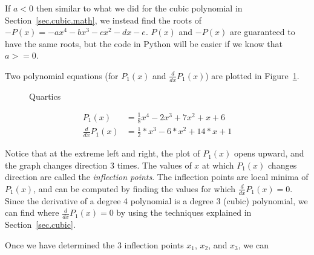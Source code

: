 If $a<0$ then similar to what we did for the cubic polynomial in Section~\ref{sec.cubic.math}, we instead find the
roots of $-P(x) = -a x^4 - b x^3 - c x^2 - d x - e$.  $P(x)$ and $-P(x)$ are guaranteed to have the same roots,
but the code in Python will be easier if we know that $a >= 0$.


Two polynomial equations (for $P_1(x)$ and $\frac{d}{dx} P_1(x)$) are plotted in Figure~\ref{fig.quartic}.

\begin{figure}
\centering

\caption{Quartics}
\label{fig.quartic}
\end{figure}

\begin{align*}
  P_1(x) &= \frac{1}{8}  x^4 -2 x^3 + 7  x^2 + x + 6\\
  \frac{d}{dx} P_1(x) &= \frac{1}{2} * x^3 -6* x^2 + 14 * x + 1
\end{align*}

Notice that at the extreme left and right, the plot of $P_1(x)$ opens
upward, and the graph changes direction 3 times.  The values of $x$ at
which $P_1(x)$ changes direction are called the \emph{inflection
points}.  The inflection points are local minima of $P_1(x)$, and can
be computed by finding the values for which $\frac{d}{dx} P_1(x) = 0$.
Since the derivative of a degree 4 polynomial is a degree 3 (cubic)
polynomial, we can find where $\frac{d}{dx} P_1(x) = 0$ by using the
techniques explained in Section~\ref{sec.cubic}.

Once we have determined the 3 inflection points $x_1$, $x_2$, and $x_3$, we can
